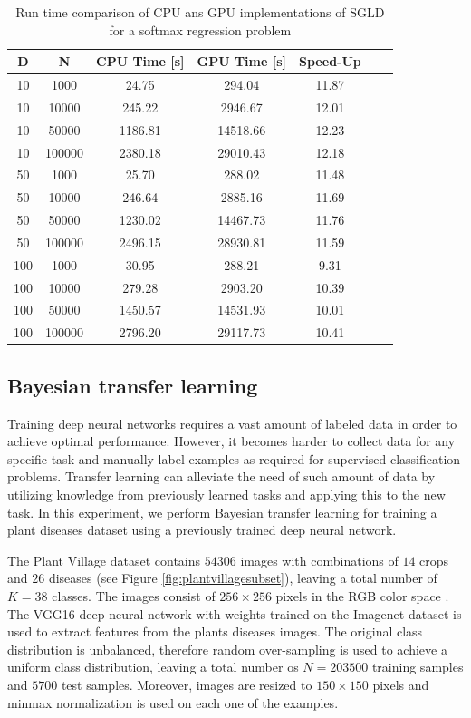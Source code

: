 \documentclass[conference]{IEEEtran}
\begin{document}
\begin{table}[h]
	\centering
	\begin{tabular}{|c|c|c|c|c|c|c|}
		\hline 
		D & N & CPU Time [s] & GPU Time [s]  & Speed-Up\\ 
		\hline 		
10	& 1000& 	24.75& 294.04  & 11.87\\
10	& 10000& 	245.22& 2946.67	& 12.01\\
10	& 50000& 	1186.81& 14518.66 & 12.23\\
10	& 100000	& 2380.18& 29010.43& 12.18\\
\hline
50	& 1000	& 25.70& 288.02	& 11.48\\
50	& 10000	& 246.64& 2885.16& 11.69\\
50	& 50000	& 1230.02& 14467.73	& 11.76\\
50 & 	100000	& 2496.15& 28930.81	& 11.59\\
\hline
100	& 1000	& 30.95& 288.21& 9.31\\
100	& 10000	& 279.28& 2903.20& 10.39\\
100	& 50000	& 1450.57& 14531.93& 10.01\\
100	& 100000& 	2796.20& 29117.73& 10.41\\

		\hline 
\end{tabular}
\caption{Run time comparison of CPU ans GPU implementations of SGLD for a softmax regression problem}
\label{tab:sgld} 
\end{table}

\subsection{Bayesian transfer learning}
Training deep neural networks requires a vast amount of labeled data in order to achieve optimal performance. However, it becomes harder to collect data for any specific task and manually label examples as required for supervised classification problems. Transfer learning can alleviate the need of such amount of data by utilizing knowledge from previously learned tasks and applying this to the new task. In this experiment, we perform Bayesian transfer learning for training a plant diseases dataset using a previously trained deep neural network.

The Plant Village dataset contains $54306$ images with combinations of $14$ crops and $26$ diseases (see Figure \ref{fig:plantvillagesubset}), leaving a total number of $K=38$ classes. The images consist of $256 \times 256$ pixels in the RGB color space \cite{mohanty2016using}.  The VGG16 deep neural network with weights trained on the Imagenet dataset is used to extract features from the plants diseases images. The original class distribution is unbalanced, therefore random over-sampling is used to achieve a uniform class distribution, leaving a total number os $N=203500$ training samples and $5700$ test samples. Moreover, images are resized to $150 \times 150$ pixels and min\-max normalization is used on each one of the examples.
\end{document}
